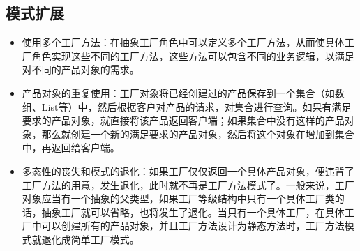 \documentclass[letterpaper,10pt,english]{sphinxmanual}
\begin{document}
\begin{sphinxVerbatim}[commandchars=\\\{\}]
 
 
 
 
\end{sphinxVerbatim}


\subsection{模式扩展}
\label{\detokenize{creational_patterns/factory_method:id13}}\begin{itemize}
\item {} 
\sphinxAtStartPar
使用多个工厂方法：在抽象工厂角色中可以定义多个工厂方法，从而使具体工厂角色实现这些不同的工厂方法，这些方法可以包含不同的业务逻辑，以满足对不同的产品对象的需求。

\item {} 
\sphinxAtStartPar
产品对象的重复使用：工厂对象将已经创建过的产品保存到一个集合（如数组、List等）中，然后根据客户对产品的请求，对集合进行查询。如果有满足要求的产品对象，就直接将该产品返回客户端；如果集合中没有这样的产品对象，那么就创建一个新的满足要求的产品对象，然后将这个对象在增加到集合中，再返回给客户端。

\item {} 
\sphinxAtStartPar
多态性的丧失和模式的退化：如果工厂仅仅返回一个具体产品对象，便违背了工厂方法的用意，发生退化，此时就不再是工厂方法模式了。一般来说，工厂对象应当有一个抽象的父类型，如果工厂等级结构中只有一个具体工厂类的话，抽象工厂就可以省略，也将发生了退化。当只有一个具体工厂，在具体工厂中可以创建所有的产品对象，并且工厂方法设计为静态方法时，工厂方法模式就退化成简单工厂模式。

\end{itemize}
\end{document}
